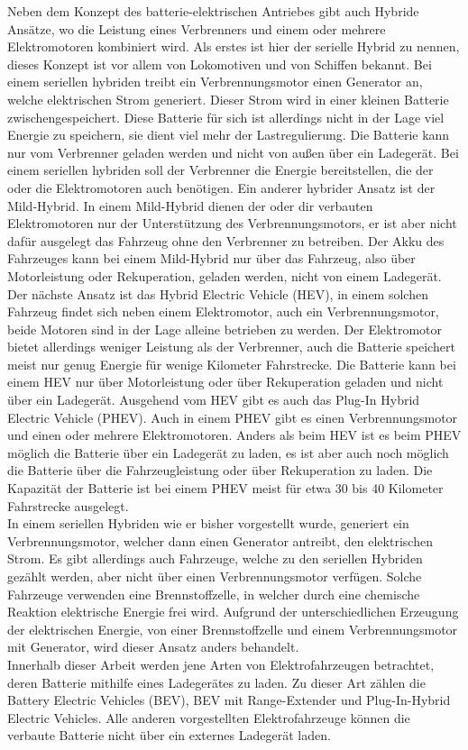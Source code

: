 Neben dem Konzept des batterie-elektrischen Antriebes gibt auch Hybride Ansätze, wo die Leistung eines Verbrenners und einem oder mehrere Elektromotoren kombiniert wird\cite{e_auto}. Als erstes ist hier der serielle Hybrid\cite{e_auto} zu nennen, dieses Konzept ist vor allem von Lokomotiven und von Schiffen bekannt. Bei einem seriellen hybriden treibt ein Verbrennungsmotor einen Generator an, welche elektrischen Strom generiert. Dieser Strom wird in einer kleinen Batterie zwischengespeichert. Diese Batterie für sich ist allerdings nicht in der Lage viel Energie zu speichern, sie dient viel mehr der Lastregulierung. Die Batterie kann nur vom Verbrenner geladen werden und nicht von außen über ein Ladegerät. Bei einem seriellen hybriden soll der Verbrenner die Energie bereitstellen, die der oder die Elektromotoren auch benötigen. Ein anderer hybrider Ansatz ist der Mild-Hybrid\cite{e_auto}. In einem Mild-Hybrid dienen der oder dir verbauten Elektromotoren nur der Unterstützung des Verbrennungsmotors, er ist aber nicht dafür ausgelegt das Fahrzeug ohne den Verbrenner zu betreiben. Der Akku des Fahrzeuges kann bei einem Mild-Hybrid nur über das Fahrzeug, also über Motorleistung oder Rekuperation, geladen werden, nicht von einem Ladegerät. Der nächste Ansatz ist das Hybrid Electric Vehicle (HEV)\cite{e_auto}, in einem solchen Fahrzeug findet sich neben einem Elektromotor, auch ein Verbrennungsmotor, beide Motoren sind in der Lage alleine betrieben zu werden. Der Elektromotor bietet allerdings weniger Leistung als der Verbrenner, auch die Batterie speichert meist nur genug Energie für wenige Kilometer Fahrstrecke. Die Batterie kann bei einem HEV nur über Motorleistung oder über Rekuperation geladen und nicht über ein Ladegerät. Ausgehend vom HEV gibt es auch das Plug-In Hybrid Electric Vehicle (PHEV)\cite{e_auto}. Auch in einem PHEV gibt es einen Verbrennungsmotor und einen oder mehrere Elektromotoren. Anders als beim HEV ist es beim PHEV möglich die Batterie über ein Ladegerät zu laden, es ist aber auch noch möglich die Batterie über die Fahrzeugleistung oder über Rekuperation zu laden. Die Kapazität der Batterie ist bei einem PHEV meist für etwa 30 bis 40 Kilometer Fahrstrecke ausgelegt.\\
In einem seriellen Hybriden wie er bisher vorgestellt wurde, generiert ein Verbrennungsmotor, welcher dann einen Generator antreibt, den elektrischen Strom. Es gibt allerdings auch Fahrzeuge, welche zu den seriellen Hybriden gezählt werden, aber nicht über einen Verbrennungsmotor verfügen. Solche Fahrzeuge verwenden eine Brennstoffzelle\cite{e_auto}, in welcher durch eine chemische Reaktion elektrische Energie frei wird. Aufgrund der unterschiedlichen Erzeugung der elektrischen Energie, von einer Brennstoffzelle und einem Verbrennungsmotor mit Generator, wird dieser Ansatz anders behandelt. \\
Innerhalb dieser Arbeit werden jene Arten von Elektrofahrzeugen betrachtet, deren Batterie mithilfe eines Ladegerätes zu laden. Zu dieser Art zählen die Battery Electric Vehicles (BEV), BEV mit Range-Extender und Plug-In-Hybrid Electric Vehicles. Alle anderen vorgestellten Elektrofahrzeuge können die verbaute Batterie nicht über ein externes Ladegerät laden. 

